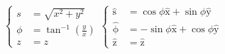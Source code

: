 \documentclass[10pt,landscape,letterpaper]{cheatsheet}
\newcommand{\bv}[1]{\bm{\mathrm{#1}}}
\newcommand{\uv}[1]{\hat{\bv{{#1}}}}
\newcommand{\ux}{\uv{x}}
\newcommand{\uy}{\uv{y}}
\begin{document}
$
\begin{cases}
s&=\sqrt{x^2+y^2}\\
\phi&=\tan^{-1}(\frac{y}{x})\\
z&=z
\end{cases}
\begin{cases}
        \uv{s}&=\cos\phi\ux+\sin\phi\uy\\
        \uv{\phi}&=-\sin\phi\ux+\cos\phi\uy\\
        \uv{z}&=\uv{z}
\end{cases}
$
\end{document}
